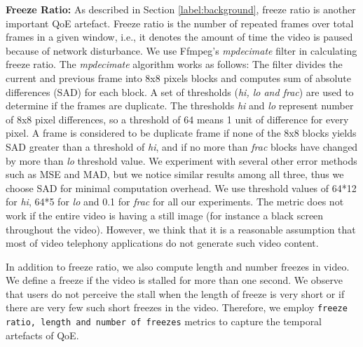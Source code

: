 \noindent \textbf{Freeze Ratio:} As described in Section \ref{label:background}, freeze ratio is another important QoE artefact. 
Freeze ratio is the number of repeated frames over total frames in a given window, i.e., it denotes the amount of time the video is paused because of network disturbance. 
We use Ffmpeg's \textit{mpdecimate} \cite{ffmpeg} filter in calculating freeze ratio. 
The \textit{mpdecimate} algorithm works as follows: The filter divides the current and previous frame into 8x8 pixels blocks  and computes sum of absolute differences (SAD) for each block. 
A set of thresholds (\textit{hi, lo and frac}) are used to determine if the frames are duplicate. 
The thresholds \textit{hi} and \textit{lo} represent number of 8x8 pixel differences, so a threshold of 64 means 1 unit of difference for every pixel. A
frame is considered to be duplicate frame if none of the 8x8 blocks yields SAD greater than a threshold of \textit{hi}, and if no more than \textit{frac} blocks have changed by more than \textit{lo} threshold value. 
We experiment with several other error methods such as MSE and MAD, but we notice similar results among all three, thus we choose SAD for minimal computation overhead. 
We use threshold values of 64*12 for \textit{hi}, 64*5 for \textit{lo} and 0.1 for \textit{frac} for all our experiments. 
The metric does not work if the entire video is having a still image (for instance a black screen throughout the video). 
However, we think that it is a reasonable assumption that most of video telephony applications do not generate such video content.

In addition to freeze ratio, we also compute length and number freezes in video. We define a freeze if the video is stalled for more than one second. We observe that users do not perceive the stall when the length of freeze is very short or if there are very few such short freezes in the video. Therefore, we employ \texttt{freeze ratio, length and number of freezes} metrics to capture the temporal artefacts of QoE.

